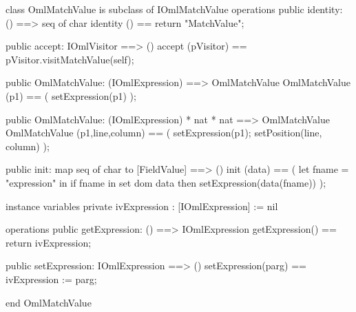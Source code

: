 \begin{vdm_al}
class OmlMatchValue is subclass of IOmlMatchValue
operations
  public identity: () ==> seq of char
  identity () == return "MatchValue";

  public accept: IOmlVisitor ==> ()
  accept (pVisitor) == pVisitor.visitMatchValue(self);

  public OmlMatchValue:
    (IOmlExpression) ==> OmlMatchValue
  OmlMatchValue (p1) == 
    ( setExpression(p1) );

  public OmlMatchValue:
    (IOmlExpression) *
    nat *
    nat ==> OmlMatchValue
  OmlMatchValue (p1,line,column) == 
    ( setExpression(p1);
      setPosition(line, column) );

  public init: map seq of char to [FieldValue] ==> ()
  init (data) ==
    ( let fname = "expression" in
        if fname in set dom data
        then setExpression(data(fname)) );

instance variables
  private ivExpression : [IOmlExpression] := nil

operations
  public getExpression: () ==> IOmlExpression
  getExpression() == return ivExpression;

  public setExpression: IOmlExpression ==> ()
  setExpression(parg) == ivExpression := parg;

end OmlMatchValue
\end{vdm_al}

